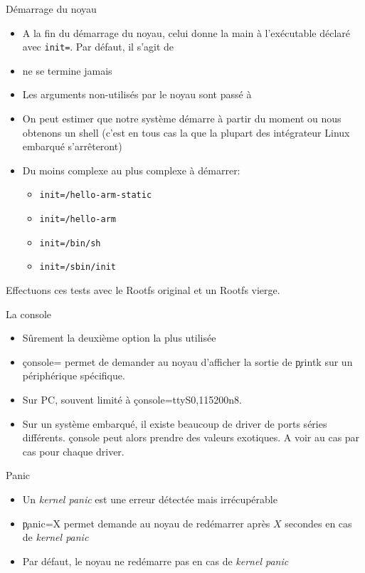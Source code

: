 \begin{frame}[fragile=singleslide]{Démarrage du noyau}
  \begin{itemize}
  \item  A  la fin  du  démarrage  du noyau,  celui  donne  la main  à
    l'exécutable déclaré  avec \verb+init=+. Par défaut,  il s'agit de
  \item {} ne se termine jamais
  \item  Les  arguments  non-utilisés   par  le  noyau  sont  passé  à
  \item On peut  estimer que notre système démarre  à partir du moment
    ou nous obtenons un shell (c'est en tous cas la que la plupart des
    intégrateur Linux embarqué s'arrêteront)
  \item Du moins complexe au plus complexe à démarrer:
  \begin{itemize}
    \item \verb+init=/hello-arm-static+
    \item \verb+init=/hello-arm+
    \item \verb+init=/bin/sh+
    \item \verb+init=/sbin/init+
    \end{itemize}
  \end{itemize}
  Effectuons ces tests avec le Rootfs original et un Rootfs vierge.
\end{frame}

\begin{frame}[fragile=singleslide]{La console}
  \begin{itemize} 
    \item Sûrement la deuxième option la plus utilisée
    \item  \c{console=}  permet de  demander  au  noyau d'afficher  la
      sortie de \c{printk} sur un périphérique spécifique.
    \item Sur PC, souvent limité à \c{console=ttyS0,115200n8}.
    \item Sur  un système  embarqué, il existe  beaucoup de  driver de
      ports  séries différents.   \c{console} peut  alors  prendre des
      valeurs exotiques. A voir au cas par cas pour chaque driver.
  \end{itemize} 
\end{frame} 

\begin{frame}[fragile=singleslide]{Panic}
  \begin{itemize} 
  \item  Un   \emph{kernel  panic}   est  une  erreur   détectée  mais
    irrécupérable
  \item \c{panic=X}  permet demande au  noyau de redémarrer  après $X$
    secondes en cas de \emph{kernel panic}
  \item Par défaut,  le noyau ne redémarre pas  en cas de \emph{kernel
      panic}
  \end{itemize} 
\end{frame} 

